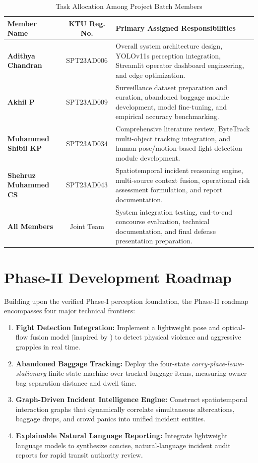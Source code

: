 \documentclass[12pt,a4paper]{report}
\begin{document}
\begin{table}[H]
\centering
\caption{Task Allocation Among Project Batch Members}
\label{tab:task_alloc}
\vspace*{5pt}
\begin{tabular}{|l|c|p{8.5cm}|}
\hline
\textbf{Member Name} & \textbf{KTU Reg. No.} & \textbf{Primary Assigned Responsibilities} \\ \hline
\textbf{Adithya Chandran} & SPT23AD006 & Overall system architecture design, YOLOv11s perception integration, Streamlit operator dashboard engineering, and edge optimization. \\ \hline
\textbf{Akhil P} & SPT23AD009 & Surveillance dataset preparation and curation, abandoned baggage module development, model fine-tuning, and empirical accuracy benchmarking. \\ \hline
\textbf{Muhammed Shibil KP} & SPT23AD034 & Comprehensive literature review, ByteTrack multi-object tracking integration, and human pose/motion-based fight detection module development. \\ \hline
\textbf{Shehruz Muhammed CS} & SPT23AD043 & Spatiotemporal incident reasoning engine, multi-source context fusion, operational risk assessment formulation, and report documentation. \\ \hline
\textbf{All Members} & Joint Team & System integration testing, end-to-end concourse evaluation, technical documentation, and final defense presentation preparation. \\ \hline
\end{tabular}
\end{table}

\section{Phase-II Development Roadmap}
Building upon the verified Phase-I perception foundation, the Phase-II roadmap encompasses four major technical frontiers:
\begin{enumerate}
    \item \textbf{Fight Detection Integration:} Implement a lightweight pose and optical-flow fusion model (inspired by \cite{p8, p14}) to detect physical violence and aggressive grapples in real time.
    \item \textbf{Abandoned Baggage Tracking:} Deploy the four-state \emph{carry-place-leave-stationary} finite state machine \cite{p21} over tracked luggage items, measuring owner-bag separation distance and dwell time.
    \item \textbf{Graph-Driven Incident Intelligence Engine:} Construct spatiotemporal interaction graphs \cite{p11} that dynamically correlate simultaneous altercations, baggage drops, and crowd panics into unified incident entities.
    \item \textbf{Explainable Natural Language Reporting:} Integrate lightweight language models \cite{p5} to synthesize concise, natural-language incident audit reports for rapid transit authority review.
\end{enumerate}
\end{document}
